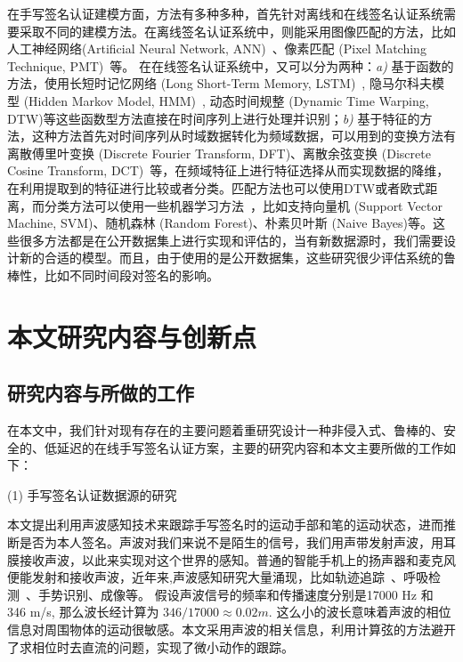 在手写签名认证建模方面，方法有多种多种，首先针对离线和在线签名认证系统需要采取不同的建模方法。在离线签名认证系统中，则能采用图像匹配的方法，比如人工神经网络(Artificial Neural Network, ANN)~\cite{chandra2016offline}、像素匹配 (Pixel Matching Technique, PMT)~\cite{bhattacharya2013offline}等。 在在线签名认证系统中，又可以分为两种：\textit{a)} 基于函数的方法，使用长短时记忆网络 (Long Short-Term Memory, LSTM)~\cite{hochreiter1997long}, 隐马尔科夫模型 (Hidden Markov Model, HMM)~\cite{rabiner1986introduction}, 动态时间规整 (Dynamic Time Warping, DTW)等这些函数型方法直接在时间序列上进行处理并识别；\textit{b)} 基于特征的方法，这种方法首先对时间序列从时域数据转化为频域数据，可以用到的变换方法有离散傅里叶变换 (Discrete Fourier Transform, DFT)、离散余弦变换 (Discrete Cosine Transform, DCT)~\cite{}等，在频域特征上进行特征选择从而实现数据的降维，在利用提取到的特征进行比较或者分类。匹配方法也可以使用DTW或者欧式距离，而分类方法可以使用一些机器学习方法~\cite{周志华2016机器学习}，比如支持向量机 (Support Vector Machine, SVM)、随机森林 (Random Forest)、朴素贝叶斯 (Naive Bayes)等。这些很多方法都是在公开数据集上进行实现和评估的，当有新数据源时，我们需要设计新的合适的模型。而且，由于使用的是公开数据集，这些研究很少评估系统的鲁棒性，比如不同时间段对签名的影响。

\section{本文研究内容与创新点}
\subsection{研究内容与所做的工作}
在本文中，我们针对现有存在的主要问题着重研究设计一种非侵入式、鲁棒的、安全的、低延迟的在线手写签名认证方案，主要的研究内容和本文主要所做的工作如下：

(1) 手写签名认证数据源的研究

本文提出利用声波感知技术来跟踪手写签名时的运动手部和笔的运动状态，进而推断是否为本人签名。声波对我们来说不是陌生的信号，我们用声带发射声波，用耳膜接收声波，以此来实现对这个世界的感知。普通的智能手机上的扬声器和麦克风便能发射和接收声波，近年来,声波感知研究大量涌现，比如轨迹追踪~\cite{wang2016device,mao2016cat,yun2017strata}、呼吸检测~\cite{WangContactless,wang2018c}、手势识别\cite{ruan2016audiogest,gupta2012soundwave,aumi2013doplink,ling2018ultragesture}、成像\cite{mao2017aim}等。
假设声波信号的频率和传播速度分别是17000 Hz 和 346 m/s, 那么波长经计算为  $346/17000\approx0.02m$. 这么小的波长意味着声波的相位信息对周围物体的运动很敏感。本文采用声波的相关信息，利用计算弦的方法避开了求相位时去直流的问题，实现了微小动作的跟踪。



